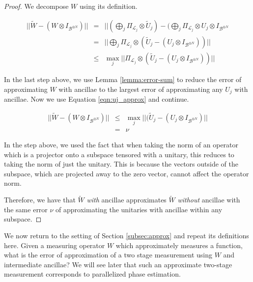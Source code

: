 \begin{proof}
We decompose $W$ using its definition.

\begin{eqnarray}
|| \tilde{W} - (W \otimes I_{\mathcal{B}^{\otimes N}}) || & = &
|| (\bigoplus_j \Pi_{\mathcal{L}_j} \otimes \tilde{U}_j) -
   (\bigoplus_j \Pi_{\mathcal{L}_j} \otimes U_j \otimes I_{\mathcal{B}^{\otimes N}}\\
& = & || \bigoplus_j \Pi_{\mathcal{L}_j} \otimes (\tilde{U}_j - (U_j \otimes I_{\mathcal{B}^{\otimes N}})) || \\
& \le & \max_j ||    \Pi_{\mathcal{L}_j} \otimes (\tilde{U}_j - (U_j \otimes I_{\mathcal{B}^{\otimes N}})) ||
\end{eqnarray}

In the last step above, we use Lemma \ref{lemma:error-sum} to reduce the
error of approximating $W$ with ancillae to the largest error of approximating
any $U_j$ with ancillae. Now we use Equation \ref{eqn:uj_approx} and continue.

\begin{eqnarray}
|| \tilde{W} - (W \otimes I_{\mathcal{B}^{\otimes N}}) || & \le &
\max_j || (\tilde{U}_j - (U_j \otimes I_{\mathcal{B}^{\otimes N}}) || \\
& = & \nu
\end{eqnarray}

In the step above, we used the fact that when taking the norm of an operator
which is a projector onto a subspace
tensored with a unitary, this reduces to taking the norm
of just the unitary. This is because the vectors outside of the subspace,
which are projected away to the zero vector, cannot affect the operator norm.

Therefore, we have that $\tilde{W}$ \emph{with} ancillae approximates $\tilde{W}$
\emph{without} ancillae with the same error $\nu$ of approximating the unitaries
with ancillae within any subspace.
\end{proof}

We now return to the setting of Section \ref{subsec:approx} and repeat
its definitions here. Given a measuring operator $W$ which approximately
measures a function, what is the error of approximation
of a two stage measurement using $W$ and intermediate ancillae?
We will see later that such an approximate two-stage measurement
corresponds to parallelized phase estimation.

